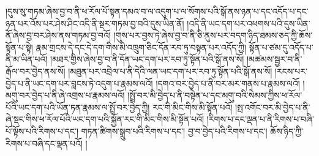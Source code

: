 །དུས་སུ་གཏམ་ཞེས་བྱ་བ་ནི་ཕ་རོལ་པོ་སྟན་དམའ་བ་ལ་འདུག་པ་ལ་སོགས་པའི་སྒོ་ནས་ཉན་པ་དང་འདོད་པ་དང་ཉན་པར་འོས་པར་ཤེས་ཤིང་འདི་ནི་སྔར་གཏམ་བྱ་བའི་དུས་ཡིན་ནོ། །འདི་ནི་ཡང་དག་པར་འཕགས་པའི་དུས་ཡིན་ནོ་ཞེས་བྱ་བར་ཤེས་ནས་གཏམ་བྱ་བའོ། །གུས་པར་བྱས་ཏེ་ཞེས་བྱ་བ་ནི་ཅི་ནུས་པར་བདག་ཉིད་ཐམས་ཅད་ཀྱི་ཆོས་སྟོན་པ་སྟེ། རྣམ་གྲངས་དེ་དང་དེ་དག་གིས་མི་འཁྲུག་ཅིང་དོན་རབ་ཏུ་བསྟན་པར་འདོད་ཀྱི། སྟོན་པ་ཙམ་དུ་འདོད་པ་ནི་མ་ཡིན་པའོ། །མཐར་གྱིས་ཞེས་བྱ་བ་ནི་དོན་ཡང་དག་པར་རབ་ཏུ་སྟོན་པའི་སྒོ་ནས་སོ། །མཚམས་སྦྱར་བ་ནི་རྒོལ་བར་བྱེད་ནས་སོ། །མཐུན་པར་འབྲེལ་པ་ནི་དེའི་ལན་ཡང་དག་པར་རབ་ཏུ་སྟོན་པའི་སྒོ་ནས་སོ། །རངས་པར་བྱེད་པ་ནི་ཡང་དག་པར་བླངས་ཏེ་འདུག་པ་རྣམས་ལའོ། །དགའ་བར་བྱེད་པ་ནི་བར་མར་གནས་པ་རྣམས་ལའོ། །མགུ་བར་བྱེད་པ་ནི་ཞེ་འགྲས་པ་རྣམས་ལའོ། །སྤྲོ་བར་མི་བྱེད་པ་ནི་བསྟེན་པ་དང་མགུ་བའི་སེམས་ཀྱིས་ཕ་རོལ་པོའི་ཡང་དག་པའི་ཡོན་ཏན་རྣམས་ལ་སྤྲོ་བར་བྱེད་ཀྱི། རང་གི་མིང་གིས་མི་སྟོན་པའོ། །སྤ་འགོང་བར་མི་བྱེད་པ་ནི་ཞེ་སྡང་གིས་ཕ་རོལ་པོའི་ཡང་དག་པའི་སྐྱོན་རང་གི་མིང་གིས་མི་སྟོན་པའོ། །རིགས་པ་དང་ལྡན་པ་ནི་རིགས་པ་བཞི་པོ་ལྟོས་པའི་རིགས་པ་དང་། གཏན་ཚིགས་སྒྲུབ་པའི་རིགས་པ་དང་། བྱ་བ་བྱེད་པའི་རིགས་པ་དང་། ཆོས་ཉིད་ཀྱི་རིགས་པ་བཞི་དང་ལྡན་པའོ། །
